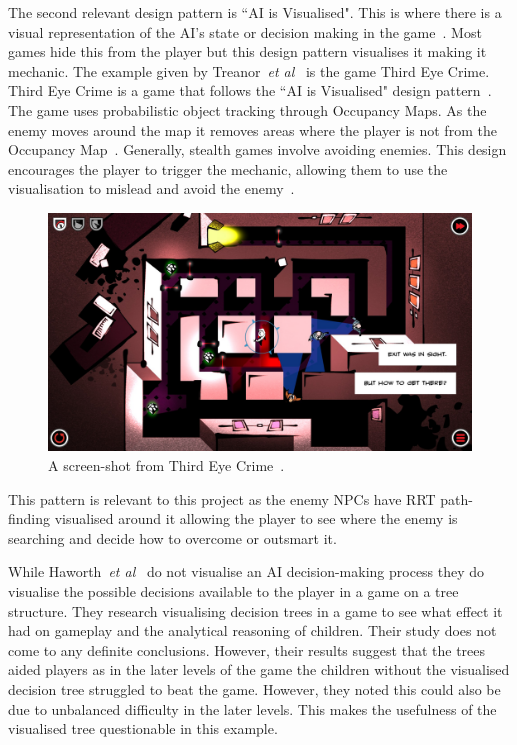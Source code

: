 \documentclass[journal]{IEEEtran}
\begin{document}
	The second relevant design pattern is ``AI is Visualised".  This is where there is a visual representation of the AI's state or decision making in the game~\cite{treanor2015}. Most games hide this from the player but this design pattern visualises it making it mechanic.  
	The example given by Treanor~\textit{et al}~\cite{treanor2015} is the game Third Eye Crime.  Third Eye Crime is a game that follows the ``AI is Visualised" design pattern~\cite{Isla2014, game:ThirdEyeCrime}. The game uses probabilistic object tracking through Occupancy Maps. As the enemy moves around the map it removes areas where the player is not from the Occupancy Map~\cite{Isla2014}.  Generally, stealth games involve avoiding enemies.  This design encourages the player to trigger the mechanic, allowing them to use the visualisation to mislead and avoid the enemy~\cite{Isla2014, game:ThirdEyeCrime}. 
	
	\begin{figure}[h]
		\includegraphics[width=1.0\linewidth]{ThirdEyeCrime.jpg}
		\caption{ A screen-shot from Third Eye Crime~\cite{game:ThirdEyeCrime}.}
		\label{image:ThirdEyeCrime}
	\end{figure}  
	
	This pattern is relevant to this project as the enemy NPCs have RRT path-finding visualised around it allowing the player to see where the enemy is searching and decide how to overcome or outsmart it.
	
	While Haworth~\textit{et al}~\cite{Haworth2010} do not visualise an AI decision-making process they do visualise the possible decisions available to the player in a game on a tree structure.   They research visualising decision trees in a game to see what effect it had on gameplay and the analytical reasoning of children.  
	Their study does not come to any definite conclusions. However, their results suggest that the trees aided players as in the later levels of the game the children without the visualised decision tree struggled to beat the game. However, they noted this could also be due to unbalanced difficulty in the later levels. This makes the usefulness of the visualised tree questionable in this example.  
	
\end{document}

